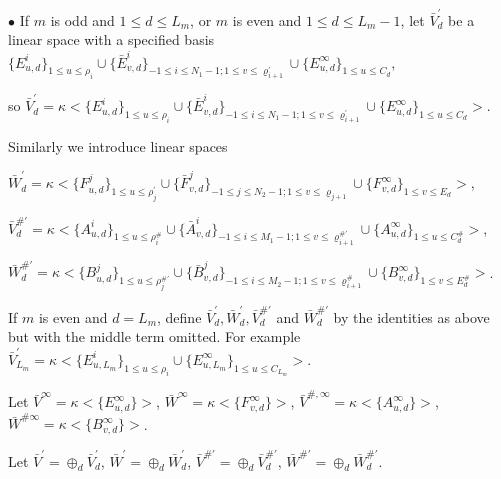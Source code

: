 \def\CTEXPreproc{Created by ctex v0.2.12, don't edit!}\documentclass[11pt]{article}
\begin{document}
\begin{pf}
   \noindent $\bullet$ If $m$ is odd and $1\leq d\leq L_m$, or $m$ is even and $1\leq d\leq L_m -1$,  let $\bar{V}^{'}_d$ be a linear space with a specified basis
   $\{ E^i _{u,d} \}_{1\leq u\leq \rho_i } \cup \{ \bar{E}^i _{v,d} \}_{-1\leq i\leq N_1 -1; 1\leq v\leq \varrho^{'}_{i+1}   }\cup \{ E^{\infty}_{u,d}\}_{1\leq u\leq C_d} $,

   so $\bar{V}^{'} _d= \kappa< \{ E^i _{u,d} \}_{1\leq u\leq \rho_i } \cup \{ \bar{E}^i_{v,d} \}_{-1\leq i\leq N_1 -1; 1\leq v\leq \varrho^{'}_{i+1}   } \cup \{ E^{\infty}_{u,d} \}_{1\leq u\leq C_d} >$.

   Similarly we introduce linear spaces

   $ \bar{W}^{'}_d=\kappa<  \{ F^j _{u,d} \}_{1\leq u\leq \rho^{'}_j } \cup \{ \bar{F}^j _{v,d} \}_{-1\leq j\leq N_2 -1; 1\leq v\leq \varrho_{j+1}   } \cup \{ F ^{\infty}_{v,d} \}_{1\leq v\leq E_d} > $,



    $\bar{V}^{\# '} _d= \kappa< \{ A^i _{u,d} \}_{1\leq u\leq \rho^{\# }_i } \cup \{ \bar{A}^i_{v,d} \}_{-1\leq i\leq M_1 -1; 1\leq v\leq \varrho^{\# '}_{i+1}   } \cup \{ A^{\infty}_{u,d} \}_{1\leq u\leq C^{\#}_d }  >$,



     $ \bar{W}^{\# '} _d=\kappa<  \{ B^j _{u,d} \}_{1\leq u\leq \rho^{\# '}_j } \cup \{ \bar{B}^j _{v,d} \}_{-1\leq i\leq M_2 -1; 1\leq v\leq \varrho^{\# }_{i+1}   } \cup \{ B^{\infty}_{v,d} \}_{1\leq v\leq E^{\#}_d } > $.

     If $m$ is even and $d=L_m$,  define $\bar{V}^{'}_d , \bar{W}^{'}_d , \bar{V}^{\# '} _d$ and $\bar{W}^{\# '} _d $ by the identities as above but with the middle term omitted. For example
     $\bar{V}^{'} _{L_m }= \kappa< \{ E^i _{u,L_m} \}_{1\leq u\leq \rho_i } \cup \{ E^{\infty}_{u,L_m} \}_{1\leq u\leq C_{L_m}} >$.

   \noindent   Let $\bar{V}^{\infty}=\kappa<  \{ E^{\infty}_{u,d} \}  >$,  $\bar{W}^{\infty}=\kappa< \{  F^{\infty}_{v,d}  \} >$,
       $\bar{V}^{\#, \infty}=\kappa<  \{ A^{\infty}_{u,d} \}  >$,
      $\bar{W}^{\# \infty}=\kappa< \{  B^{\infty}_{v,d}  \} >$.

  \noindent Let $\bar{V}^{'}= \oplus_{d} \bar{V}^{'}_d   $,  $\bar{W}^{'}= \oplus_{d} \bar{W}^{'} _d    $,
    $\bar{V}^{\# '}= \oplus_{d} \bar{V}^{\# '}_d   $, $\bar{W}^{\# '} = \oplus_{d} \bar{W}^{\# '}_d  $.



\end{pf}
\end{document}
